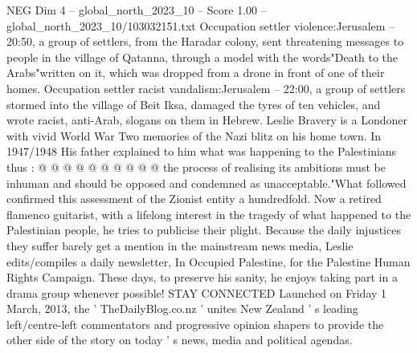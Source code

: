 \begin{textsample}{NEG Dim 4 – global\_north\_2023\_10 – Score 1.00 – global\_north\_2023\_10/103032151.txt}
Occupation settler violence:Jerusalem -- 20:50, a group of settlers, from the Haradar colony, sent threatening messages to people in the village of Qatanna, through a model with the words"Death to the Arabs"written on it, which was dropped from a drone in front of one of their homes.
Occupation settler racist vandalism:Jerusalem -- 22:00, a group of settlers stormed into the village of Beit Iksa, damaged the tyres of ten vehicles, and wrote racist, anti-Arab, slogans on them in Hebrew.
Leslie Bravery is a Londoner with vivid World War Two memories of the Nazi blitz on his home town.
In 1947/1948 His father explained to him what was happening to the Palestinians thus : @ @ @ @ @ @ @ @ @ @ the process of realising its ambitions must be inhuman and should be opposed and condemned as unacceptable."What followed confirmed this assessment of the Zionist entity a hundredfold.
Now a retired flamenco guitarist, with a lifelong interest in the tragedy of what happened to the Palestinian people, he tries to publicise their plight.
Because the daily injustices they suffer barely get a mention in the mainstream news media, Leslie edits/compiles a daily newsletter, In Occupied Palestine, for the Palestine Human Rights Campaign.
These days, to preserve his sanity, he enjoys taking part in a drama group whenever possible!
STAY CONNECTED Launched on Friday 1 March, 2013, the ' TheDailyBlog.co.nz ' unites New Zealand ' s leading left/centre-left commentators and progressive opinion shapers to provide the other side of the story on today ' s news, media and political agendas.

\end{textsample}
